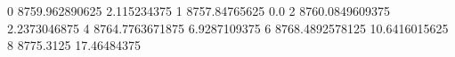 0 8759.962890625 2.115234375
1 8757.84765625 0.0
2 8760.0849609375 2.2373046875
4 8764.7763671875 6.9287109375
6 8768.4892578125 10.6416015625
8 8775.3125 17.46484375
